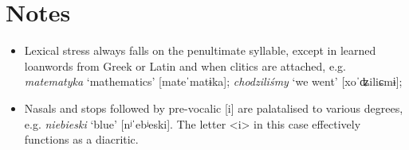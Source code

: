 \section*{Notes}

\begin{itemize}
    \item Lexical stress always falls on the penultimate syllable, except in learned loanwords from Greek or Latin and when clitics are attached, e.g. \textit{matematyka} `mathematics' [mateˈmatɨka]; \textit{chodziliśmy} `we went' [xoˈʥiliɕmɨ];
    \item Nasals and stops followed by pre-vocalic [i] are palatalised to various degrees, e.g. \textit{niebieski} `blue' [nʲˈebʲeski]. The letter <i> in this case effectively functions as a diacritic.
\end{itemize}
